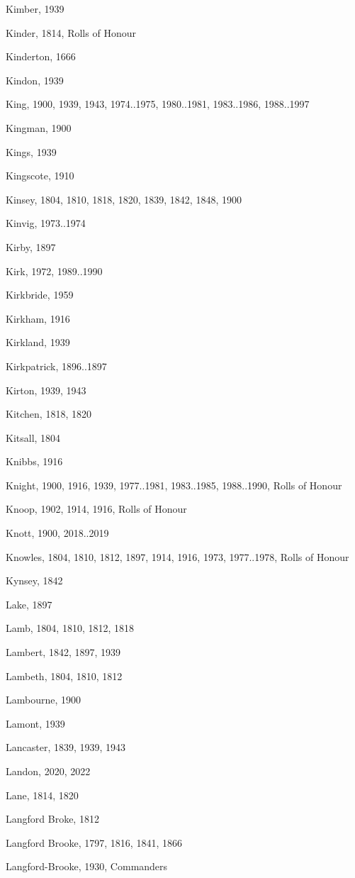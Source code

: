 \begin{theindex}
\item Kimber, 1939
\item Kinder, 1814, Rolls of Honour
\item Kinderton, 1666
\item Kindon, 1939
\item King, 1900, 1939, 1943, 1974..1975, 1980..1981, 1983..1986, 1988..1997
\item Kingman, 1900
\item Kings, 1939
\item Kingscote, 1910
\item Kinsey, 1804, 1810, 1818, 1820, 1839, 1842, 1848, 1900
\item Kinvig, 1973..1974
\item Kirby, 1897
\item Kirk, 1972, 1989..1990
\item Kirkbride, 1959
\item Kirkham, 1916
\item Kirkland, 1939
\item Kirkpatrick, 1896..1897
\item Kirton, 1939, 1943
\item Kitchen, 1818, 1820
\item Kitsall, 1804
\item Knibbs, 1916
\item Knight, 1900, 1916, 1939, 1977..1981, 1983..1985, 1988..1990, Rolls of Honour
\item Knoop, 1902, 1914, 1916, Rolls of Honour
\item Knott, 1900, 2018..2019
\item Knowles, 1804, 1810, 1812, 1897, 1914, 1916, 1973, 1977..1978, Rolls of Honour
\item Kynsey, 1842
\item Lake, 1897
\item Lamb, 1804, 1810, 1812, 1818
\item Lambert, 1842, 1897, 1939
\item Lambeth, 1804, 1810, 1812
\item Lambourne, 1900
\item Lamont, 1939
\item Lancaster, 1839, 1939, 1943
\item Landon, 2020, 2022
\item Lane, 1814, 1820
\item Langford Broke, 1812
\item Langford Brooke, 1797, 1816, 1841, 1866
\item Langford-Brooke, 1930, Commanders

\end{theindex}
